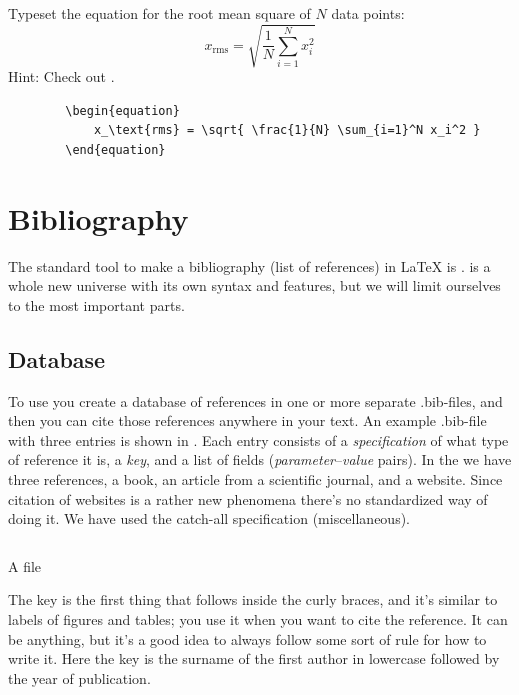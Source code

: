 {\begin{ExerciseList}
	\Exercise Typeset the equation for the root mean square of $N$ data points:
		\begin{equation}
			x_\text{rms} = \sqrt{ \frac{1}{N} \sum_{i=1}^N x_i^2 }
		\end{equation}
		Hint: Check out \latexin{\sum}.
	\Answer ~\\
	\begin{verbatim}
		\begin{equation}
			x_\text{rms} = \sqrt{ \frac{1}{N} \sum_{i=1}^N x_i^2 }
		\end{equation}
	\end{verbatim}
	
\end{ExerciseList}

\section{Bibliography}
The standard tool to make a bibliography (list of references) in \LaTeX{} is \bibtex{}. \bibtex{} is a whole new universe with its own syntax and features, but we will limit ourselves to the most important parts.

\subsection{Database}
To use \bibtex{} you create a database of references in one or more separate .bib-files, and then you can cite those references anywhere in your text. An example .bib-file with three entries is shown in . Each entry consists of a \emph{specification} of what type of reference it is, a \emph{key}, and a list of fields (\emph{parameter}--\emph{value} pairs). In  the we have three references, a book, an article from a scientific journal, and a website. Since citation of websites is a rather new phenomena there's no standardized way of doing it. We have used the catch-all specification  (miscellaneous).

\begin{listing}
	\inputminted[frame=lines,linenos]{latex}{latex/main.bib}
	\caption{A \bibtex{} file}
	\label{lst:latex:bibtex}
\end{listing}

The key is the first thing that follows inside the curly braces, and it's similar to labels of figures and tables; you use it when you want to cite the reference. It can be anything, but it's a good idea to always follow some sort of rule for how to write it. Here the key is the surname of the first author in lowercase followed by the year of publication.

}
